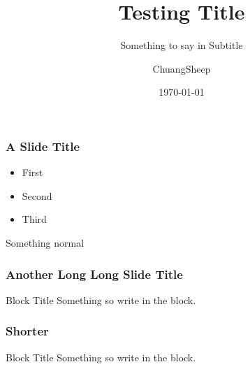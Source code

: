\documentclass[american,aspectratio=169]{beamer}
\title{Testing Title}
\subtitle{Something to say in Subtitle}
\date{\today}
\author{ChuangSheep}
\begin{document}
\begin{frame} 
  \titlepage
\end{frame} 


\begin{iframe}
  \frametitle{A Slide Title}

  \begin{itemize}
    \item First
    \item Second 
    \item Third
  \end{itemize}

  Something normal
\end{iframe}

\begin{indentedframe}
  \frametitle{Another Long Long Slide Title}
  \begin{block}{Block Title}
    Something so write in the block. 
  \end{block}
\end{indentedframe}

\begin{indentedframe}
  \frametitle{Shorter}
  \begin{block}{Block Title}
    Something so write in the block. 
  \end{block}
\end{indentedframe}
\end{document}
